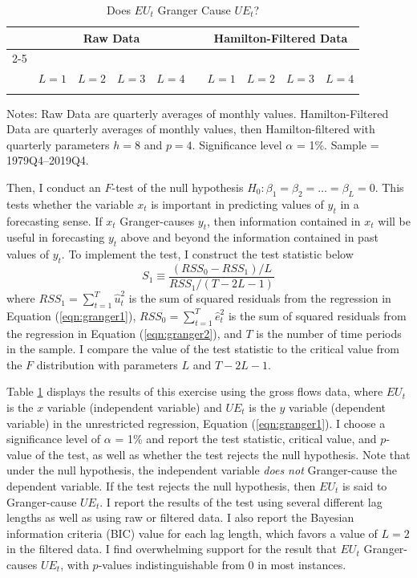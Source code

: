 \documentclass[12pt]{article}
\newcommand{\inputpath}{../output/tables/}
\begin{document}
\begin{table}[t!]
\centering
\caption{Does $EU_t$ Granger Cause $UE_t$?}\label{tab:granger_eu_ue}
\begin{threeparttable}\small
\begin{tabular}{c c c c c c c c c c}
\toprule
& \multicolumn{4}{c}{Raw Data} & & \multicolumn{4}{c}{Hamilton-Filtered Data} \\\cline{2-5}\cline{7-10}
& & & & & & & & &\\[-0.35cm]
& $L = 1$ & $L = 2$ & $L = 3$ & $L = 4$ & & $L = 1$ & $L = 2$ & $L = 3$ & $L = 4$\\ \hline
& & & & & & & & &\\[-0.35cm]

\bottomrule
\end{tabular}
\begin{tablenotes}\footnotesize
Notes: Raw Data are quarterly averages of monthly values. Hamilton-Filtered Data are quarterly averages of monthly values, then Hamilton-filtered with quarterly parameters $h = 8$ and $p = 4$. Significance level $\alpha$ = 1\%. Sample = 1979Q4--2019Q4.
\end{tablenotes}
\end{threeparttable}
\end{table}

Then, I conduct an $F$-test of the null hypothesis $ H_0: \beta_1 = \beta_2 = \dots = \beta_L = 0 $. This tests whether the variable $x_t$ is important in predicting values of $y_t$ in a forecasting sense. If $x_t$ Granger-causes $y_t$, then information contained in $x_t$ will be useful in forecasting $y_t$ above and beyond the information contained in past values of $y_t$. To implement the test, I construct the test statistic below
$$S_1 \equiv \frac{(RSS_0 - RSS_1)/L}{RSS_1/(T-2L-1)} $$
where $RSS_1 = \sum_{t=1}^T \hat u_t^2$ is the sum of squared residuals from the regression in Equation (\ref{eqn:granger1}), $RSS_0 = \sum_{t=1}^T \hat e_t^2$ is the sum of squared residuals from the regression in Equation (\ref{eqn:granger2}), and $T$ is the number of time periods in the sample. I compare the value of the test statistic to the critical value from the $F$ distribution with parameters $L$ and $T-2L-1$.

Table \ref{tab:granger_eu_ue} displays the results of this exercise using the gross flows data, where $EU_t$ is the $x$ variable (independent variable) and $UE_t$ is the $y$ variable (dependent variable) in the unrestricted regression, Equation (\ref{eqn:granger1}). I choose a significance level of $\alpha$ = 1\% and report the test statistic, critical value, and $p$-value of the test, as well as whether the test rejects the null hypothesis. Note that under the null hypothesis, the independent variable \textit{does not} Granger-cause the dependent variable. If the test rejects the null hypothesis, then $EU_t$ is said to Granger-cause $UE_t$. I report the results of the test using several different lag lengths as well as using raw or filtered data. I also report the Bayesian information criteria (BIC) value for each lag length, which favors a value of $L=2$ in the filtered data. I find overwhelming support for the result that $EU_t$ Granger-causes $UE_t$, with $p$-values indistinguishable from 0 in most instances. 
\end{document}

